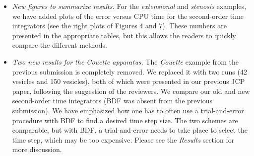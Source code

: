 \documentclass[12pt]{article}
\newcommand{\todo}[1]{{\color{red} #1}}
\begin{document}
\begin{itemize}

  \item {\em New figures to summarize results.} For the {\em
  extensional} and {\em stenosis} examples, we have added plots of the
  error versus CPU time for the second-order time integrators (see the
  right plots of Figures 4 and 7).  These numbers are presented in the
  appropriate tables, but this allows the readers to quickly compare
  the different methods.


  \item {\em Two new results for the Couette apparatus.}  The {\em
  Couette} example from the previous submission is completely removed.
  We replaced it with two runs (42 vesicles and 150 vesicles), both of
  which were presented in our previous JCP paper, following the
  suggestion of the reviewers.  We compare our old and new second-order
  time integrators (BDF was absent from the previous submission).  We
  have emphasized how one has to often use a trial-and-error procedure
  with BDF to find a desired time step size.  The two schemes are
  comparable, but with BDF, a trial-and-error needs to take place to
  select the time step, which may be too expensive. Please see the
  {\em Results} section for more discussion.



\end{itemize}
\end{document}
